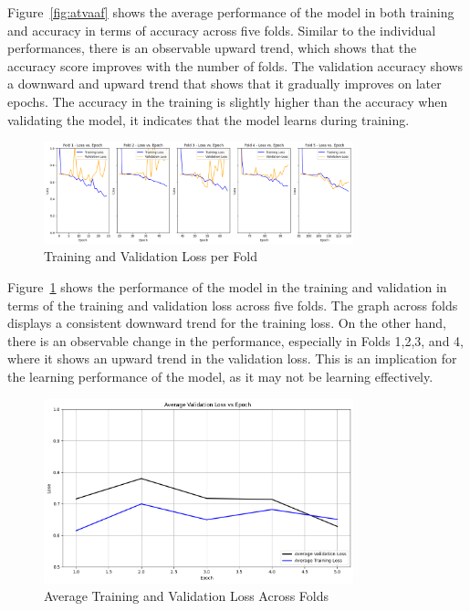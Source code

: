 Figure~\ref{fig:atvaaf} shows the average performance of the model in both training and accuracy in terms of accuracy across five folds. Similar to the individual performances, there is an observable upward trend, which shows that the accuracy score improves with the number of folds. The validation accuracy shows a downward and upward trend that shows that it gradually improves on later epochs. The accuracy in the training is slightly higher than the accuracy when validating the model, it indicates that the model learns during training.

\begin{figure}[!htbp]
	\centering
	\includegraphics[width=0.8\textwidth]{figures/loss_epoch.png}
	\caption{Training and Validation Loss per Fold}
	\label{fig:tvlpf}
\end{figure}

Figure~\ref{fig:tvlpf} shows the performance of the model in the training and validation in terms of the training and validation loss across five folds. The graph across folds displays a consistent downward trend for the training loss. On the other hand, there is an observable change in the performance, especially in Folds 1,2,3, and 4, where it shows an upward trend in the validation loss. This is an implication for the learning performance of the model, as it may not be learning effectively. 

\begin{figure}[!htbp]
	\centering
	\includegraphics[width=0.8\textwidth]{figures/avg_loss.png}
	\caption{Average Training and Validation Loss Across Folds}
	\label{fig:atvlaf}
\end{figure}

